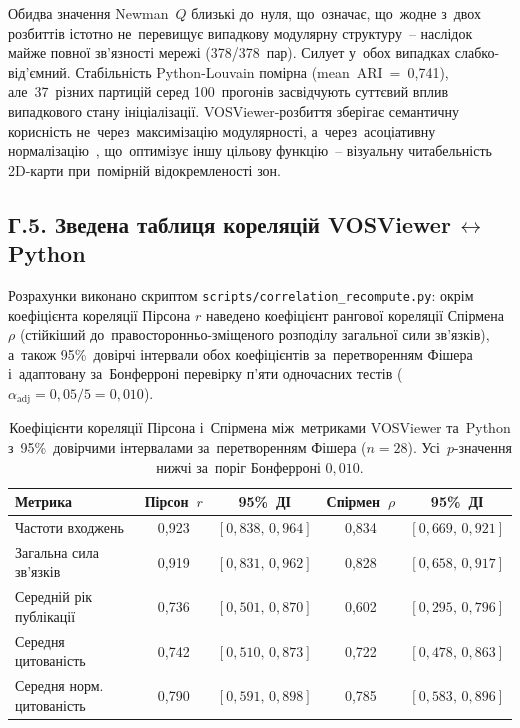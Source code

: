 Обидва значення Newman~$Q$ близькі до~нуля, що~означає, що~жодне з~двох розбиттів істотно не~перевищує випадкову модулярну структуру~-- наслідок майже повної зв'язності мережі (378/378~пар). Силует у~обох випадках слабко-від'ємний. Стабільність Python-Louvain помірна (mean~ARI~=~0,741), але~37~різних партицій серед 100~прогонів засвідчують суттєвий вплив випадкового стану ініціалізації. VOSViewer-розбиття зберігає семантичну корисність не~через~максимізацію модулярності, а~через~асоціативну нормалізацію~\cite{vanEck2010, Waltman2010}, що~оптимізує іншу цільову функцію~-- візуальну читабельність 2D-карти при~помірній відокремленості зон.

\subsection*{Г.5. Зведена таблиця кореляцій VOSViewer\,$\leftrightarrow$\,Python}
\label{app:bibliometric-correlations}

Розрахунки виконано скриптом \texttt{scripts/correlation\_recompute.py}: окрім коефіцієнта кореляції Пірсона $r$ наведено коефіцієнт рангової кореляції Спірмена~$\rho$ (стійкіший до~правосторонньо-зміщеного розподілу загальної сили зв'язків), а~також 95\%~довірчі інтервали обох коефіцієнтів за~перетворенням Фішера і~адаптовану за~Бонферроні перевірку п'яти одночасних тестів ($\alpha_{\text{adj}}=0{,}05/5=0{,}010$).

\begin{table}[htbp]
\centering
\caption{Коефіцієнти кореляції Пірсона і~Спірмена між~метриками VOSViewer та~Python з~95\%~довірчими інтервалами за~перетворенням Фішера ($n=28$). Усі~$p$-значення нижчі за~поріг Бонферроні $0{,}010$.}
\label{tab:correlations_full}
\footnotesize
\setlength\tabcolsep{3pt}
\begin{tabular}{|l|c|c|c|c|}
\hline
\textbf{Метрика} & \textbf{Пірсон~$r$} & \textbf{95\%~ДІ} & \textbf{Спірмен~$\rho$} & \textbf{95\%~ДІ} \\
\hline
Частоти входжень & 0,923 & $[0{,}838,\,0{,}964]$ & 0,834 & $[0{,}669,\,0{,}921]$ \\
\hline
Загальна сила зв'язків & 0,919 & $[0{,}831,\,0{,}962]$ & 0,828 & $[0{,}658,\,0{,}917]$ \\
\hline
Середній рік публікації & 0,736 & $[0{,}501,\,0{,}870]$ & 0,602 & $[0{,}295,\,0{,}796]$ \\
\hline
Середня цитованість & 0,742 & $[0{,}510,\,0{,}873]$ & 0,722 & $[0{,}478,\,0{,}863]$ \\
\hline
Середня норм. цитованість & 0,790 & $[0{,}591,\,0{,}898]$ & 0,785 & $[0{,}583,\,0{,}896]$ \\
\hline
\end{tabular}
\end{table}

